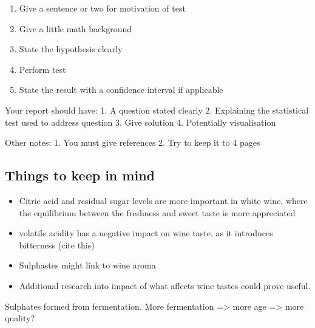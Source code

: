\documentclass[
]{article}
\providecommand{\tightlist}{%
  \setlength{\itemsep}{0pt}\setlength{\parskip}{0pt}}
\begin{document}
\begin{enumerate}
\def\labelenumi{\arabic{enumi}.}
\tightlist
\item
  Give a sentence or two for motivation of test
\item
  Give a little math background
\item
  State the hypothesis clearly
\item
  Perform test
\item
  State the result with a confidence interval if applicable
\end{enumerate}

Your report should have: 1. A question stated clearly 2. Explaining the
statistical test used to address question 3. Give solution 4.
Potentially visualisation

Other notes: 1. You must give references 2. Try to keep it to 4 pages

\subsection{Things to keep in mind}\label{things-to-keep-in-mind}

\begin{itemize}
\tightlist
\item
  Citric acid and residual sugar levels are more important in white
  wine, where the equilibrium between the freshness and sweet taste is
  more appreciated
\item
  volatile acidity has a negative impact on wine taste, as it introduces
  bitterness (cite this)
\item
  Sulphastes might link to wine aroma
\item
  Additional research into impact of what affects wine tastes could
  prove useful.
\end{itemize}

Sulphates formed from fermentation. More fermentation =\textgreater{}
more age =\textgreater{} more quality?

\printbibliography
\end{document}
